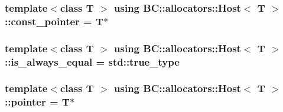 \subsubsection[{\texorpdfstring{const\+\_\+pointer}{const_pointer}}]{\setlength{\rightskip}{0pt plus 5cm}template$<$class T $>$ using {\bf B\+C\+::allocators\+::\+Host}$<$ T $>$\+::{\bf const\+\_\+pointer} =  T$\ast$}\hypertarget{structBC_1_1allocators_1_1Host_afee64cff8e4726203834cb86a94a5761}{}\label{structBC_1_1allocators_1_1Host_afee64cff8e4726203834cb86a94a5761}
\subsubsection[{\texorpdfstring{is\+\_\+always\+\_\+equal}{is_always_equal}}]{\setlength{\rightskip}{0pt plus 5cm}template$<$class T $>$ using {\bf B\+C\+::allocators\+::\+Host}$<$ T $>$\+::{\bf is\+\_\+always\+\_\+equal} =  std\+::true\+\_\+type}\hypertarget{structBC_1_1allocators_1_1Host_a71dcf87309308a9e792e381c233b3b1a}{}\label{structBC_1_1allocators_1_1Host_a71dcf87309308a9e792e381c233b3b1a}
\subsubsection[{\texorpdfstring{pointer}{pointer}}]{\setlength{\rightskip}{0pt plus 5cm}template$<$class T $>$ using {\bf B\+C\+::allocators\+::\+Host}$<$ T $>$\+::{\bf pointer} =  T$\ast$}\hypertarget{structBC_1_1allocators_1_1Host_a02ff007cb4b935aea02771535ef19205}{}\label{structBC_1_1allocators_1_1Host_a02ff007cb4b935aea02771535ef19205}
